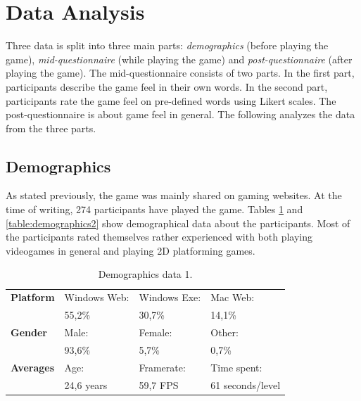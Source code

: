 \section{Data Analysis} \label{data}
Three data is split into three main parts: \textit{demographics} (before playing the game), \textit{mid-questionnaire} (while playing the game) and \textit{post-questionnaire} (after playing the game). The mid-questionnaire consists of two parts. In the first part, participants describe the game feel in their own words. In the second part, participants rate the game feel on pre-defined words using Likert scales. The post-questionnaire is about game feel in general. The following analyzes the data from the three parts.

\subsection{Demographics}
As stated previously, the game was mainly shared on gaming websites. At the time of writing, 274 participants have played the game. Tables \ref{table:demographics1} and \ref{table:demographics2} show demographical data about the participants. Most of the participants rated themselves rather experienced with both playing videogames in general and playing 2D platforming games.

\begin{table}[htbp]
\scriptsize
\centering
\begin{tabular}{|l|l|l|l|}
\hline
\textbf{Platform} & Windows Web: & Windows Exe: & Mac Web: \\
                  & 55,2\%      & 30,7\%      & 14,1\%  \\
\hline
\textbf{Gender}   & Male:        & Female:      & Other:   \\
                  & 93,6\%      & 5,7\%       & 0,7\%   \\
\hline
\textbf{Averages}      & Age:     & Framerate:            & Time spent:        \\
                  & 24,6 years  & 59,7 FPS           & 61 seconds/level        \\
\hline
\end{tabular}
\caption{Demographics data 1.}
\label{table:demographics1}
\end{table}

